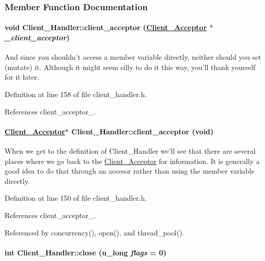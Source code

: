 \subsubsection{Member Function Documentation}
\hypertarget{classClient__Handler_Client__Handlerb4}{
\paragraph[client\_\-acceptor]{\setlength{\rightskip}{0pt plus 5cm}void Client\_\-Handler::client\_\-acceptor (\hyperlink{classClient__Acceptor}{Client\_\-Acceptor} $\ast$ {\em \_\-client\_\-acceptor})}\hfill}
\label{classClient__Handler_Client__Handlerb4}


And since you shouldn't access a member variable directly, neither should you set (mutate) it. Although it might seem silly to do it this way, you'll thank yourself for it later. 

Definition at line 158 of file client\_\-handler.h.

References client\_\-acceptor\_\-.\hypertarget{classClient__Handler_Client__Handlerb3}{
\paragraph[client\_\-acceptor]{\setlength{\rightskip}{0pt plus 5cm}\hyperlink{classClient__Acceptor}{Client\_\-Acceptor}$\ast$ Client\_\-Handler::client\_\-acceptor (void)}\hfill}
\label{classClient__Handler_Client__Handlerb3}


When we get to the definition of Client\_\-Handler we'll see that there are several places where we go back to the \hyperlink{classClient__Acceptor}{Client\_\-Acceptor} for information. It is generally a good idea to do that through an accesor rather than using the member variable directly. 

Definition at line 150 of file client\_\-handler.h.

References client\_\-acceptor\_\-.

Referenced by concurrency(), open(), and thread\_\-pool().\hypertarget{classClient__Handler_Client__Handlera3}{
\paragraph[close]{\setlength{\rightskip}{0pt plus 5cm}int Client\_\-Handler::close (u\_\-long {\em flags} = 0)}\hfill}
\label{classClient__Handler_Client__Handlera3}


